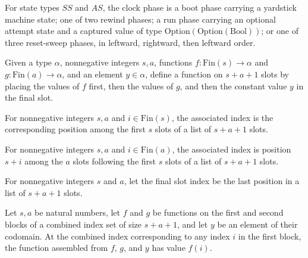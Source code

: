 \begin{definition}
\label{Turing.ClockPhase}
\leanok
For state types $SS$ and $AS$, the clock phase is a boot phase carrying a yardstick
machine state; one of two rewind phases; a run phase carrying an optional attempt state
and a captured value of type $\mathrm{Option}(\mathrm{Option}(\mathrm{Bool}))$; or one
of three reset-sweep phases, in leftward, rightward, then leftward order.
\end{definition}

\begin{definition}
\label{Turing.ClockHost.slots}
\leanok
Given a type $\alpha$, nonnegative integers $s,a$, functions
$f:\mathrm{Fin}(s)\to\alpha$ and $g:\mathrm{Fin}(a)\to\alpha$, and an element
$y\in\alpha$, define a function on $s+a+1$ slots by placing the values of $f$ first,
then the values of $g$, and then the constant value $y$ in the final slot.
\end{definition}

\begin{definition}
\label{Turing.ClockHost.sI}
\leanok
For nonnegative integers $s,a$ and $i\in\mathrm{Fin}(s)$, the associated index is the
corresponding position among the first $s$ slots of a list of $s+a+1$ slots.
\end{definition}

\begin{definition}
\label{Turing.ClockHost.aI}
\leanok
For nonnegative integers $s,a$ and $i\in\mathrm{Fin}(a)$, the associated index is
position $s+i$ among the $a$ slots following the first $s$ slots of a list of $s+a+1$
slots.
\end{definition}

\begin{definition}
\label{Turing.ClockHost.yI}
\leanok
For nonnegative integers $s$ and $a$, let the final slot index be the last position in a
list of $s+a+1$ slots.
\end{definition}

\begin{theorem}
\label{Turing.ClockHost.slots_sI}
\leanok
{}
Let $s,a$ be natural numbers, let $f$ and $g$ be functions on the first and second
blocks of a combined index set of size $s+a+1$, and let $y$ be an element of their
codomain. At the combined index corresponding to any index $i$ in the first block, the
function assembled from $f$, $g$, and $y$ has value $f(i)$.
\end{theorem}

